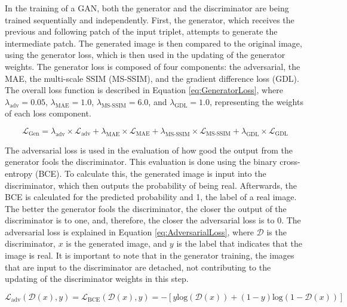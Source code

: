 In the training of a GAN, both the generator and the discriminator are being trained sequentially and independently. First, the generator, which receives the previous and following patch of the input triplet, attempts to generate the intermediate patch. The generated image is then compared to the original image, using the generator loss, which is then used in the updating of the generator weights. The generator loss is composed of four components: the adversarial, the MAE, the multi-scale SSIM (MS-SSIM), and the gradient difference loss (GDL). The overall loss function is described in Equation \ref{eq:GeneratorLoss}, where $\lambda_{\text{adv}}=0.05$, $\lambda_{\text{MAE}}=1.0$, $\lambda_{\text{MS-SSIM}}=6.0$, and $\lambda_{\text{GDL}}=1.0$, representing the weights of each loss component.

\begin{equation}
	\mathcal{L}_{\text{Gen}} = \lambda_{\text{adv}} \times \mathcal{L}_{\text{adv}} + \lambda_{\text{MAE}} \times \mathcal{L}_{\text{MAE}} + \lambda_{\text{MS-SSIM}} \times \mathcal{L}_{\text{MS-SSIM}} + \lambda_{\text{GDL}} \times \mathcal{L}_{\text{GDL}}
	\label{eq:GeneratorLoss}
\end{equation}

The adversarial loss is used in the evaluation of how good the output from the generator fools the discriminator. This evaluation is done using the binary cross-entropy (BCE). To calculate this, the generated image is input into the discriminator, which then outputs the probability of being real. Afterwards, the BCE is calculated for the predicted probability and 1, the label of a real image. The better the generator fools the discriminator, the closer the output of the discriminator is to one, and, therefore, the closer the adversarial loss is to 0. The adversarial loss is explained in Equation \ref{eq:AdversarialLoss}, where $\mathcal{D}$ is the discriminator, $x$ is the generated image, and $y$ is the label that indicates that the image is real. It is important to note that in the generator training, the images that are input to the discriminator are detached, not contributing to the updating of the discriminator weights in this step.

\begin{equation}
	\mathcal{L}_{\text{adv}} (\mathcal{D}(x), y) = \mathcal{L}_{\text{BCE}} (\mathcal{D}(x), y) = - \left[ y \text{log}(\mathcal{D}(x)) + (1 - y)\text{log}(1 - \mathcal{D}(x)) \right]
	\label{eq:AdversarialLoss}
\end{equation}

